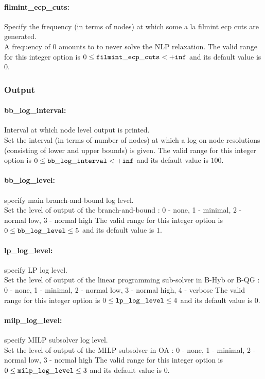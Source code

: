 \paragraph{filmint\_ecp\_cuts:} Specify the frequency (in terms of nodes) at which some a la filmint ecp cuts are generated. $\;$ \\
 A frequency of 0 amounts to to never solve the
NLP relaxation. The valid range for this integer option is
$0 \le {\tt filmint\_ecp\_cuts } <  {\tt +inf}$
and its default value is $0$.


\subsubsection{Output}
\label{sec:bonmin_output_options}
\paragraph{bb\_log\_interval:} Interval at which node level output is printed. $\;$ \\
 Set the interval (in terms of number of nodes) at
which a log on node resolutions (consisting of
lower and upper bounds) is given. The valid range for this integer option is
$0 \le {\tt bb\_log\_interval } <  {\tt +inf}$
and its default value is $100$.


\paragraph{bb\_log\_level:} specify main branch-and-bound log level. $\;$ \\
 Set the level of output of the branch-and-bound :
0 - none, 1 - minimal, 2 - normal low, 3 - normal
high The valid range for this integer option is
$0 \le {\tt bb\_log\_level } \le 5$
and its default value is $1$.


\paragraph{lp\_log\_level:} specify LP log level. $\;$ \\
 Set the level of output of the linear programming
sub-solver in B-Hyb or B-QG : 0 - none, 1 -
minimal, 2 - normal low, 3 - normal high, 4 -
verbose The valid range for this integer option is
$0 \le {\tt lp\_log\_level } \le 4$
and its default value is $0$.

\paragraph{milp\_log\_level:} specify MILP subsolver log level. $\;$ \\
 Set the level of output of the MILP subsolver in
OA : 0 - none, 1 - minimal, 2 - normal low, 3 -
normal high The valid range for this integer option is
$0 \le {\tt milp\_log\_level } \le 3$
and its default value is $0$.


